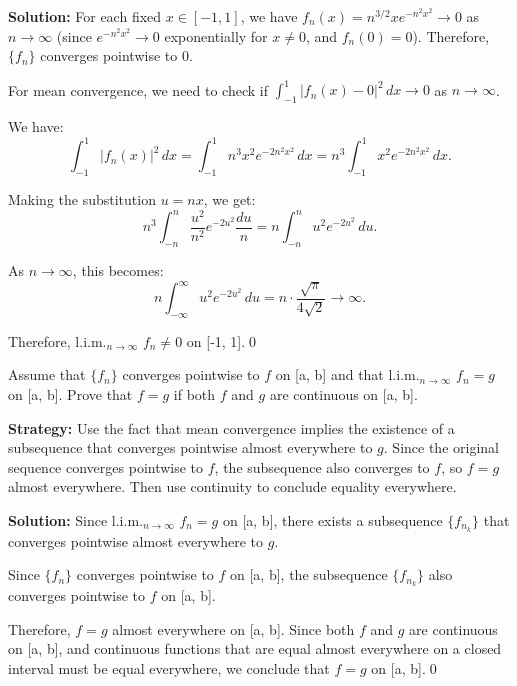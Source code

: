 \bigskip\noindent\textbf{Solution:} For each fixed \( x \in [-1, 1] \), we have \( f_n(x) = n^{3/2}xe^{-n^2x^2} \to 0 \) as \( n \to \infty \) (since \( e^{-n^2x^2} \to 0 \) exponentially for \( x \neq 0 \), and \( f_n(0) = 0 \)). Therefore, \( \{f_n\} \) converges pointwise to 0.

For mean convergence, we need to check if \( \int_{-1}^1 |f_n(x) - 0|^2 \, dx \to 0 \) as \( n \to \infty \).

We have:
\[\int_{-1}^1 |f_n(x)|^2 \, dx = \int_{-1}^1 n^3 x^2 e^{-2n^2x^2} \, dx = n^3 \int_{-1}^1 x^2 e^{-2n^2x^2} \, dx.\]

Making the substitution \( u = nx \), we get:
\[n^3 \int_{-n}^n \frac{u^2}{n^2} e^{-2u^2} \frac{du}{n} = n \int_{-n}^n u^2 e^{-2u^2} \, du.\]

As \( n \to \infty \), this becomes:
\[n \int_{-\infty}^{\infty} u^2 e^{-2u^2} \, du = n \cdot \frac{\sqrt{\pi}}{4\sqrt{2}} \to \infty.\]

Therefore, l.i.m.\(_{n\to\infty}\) \( f_n \neq 0 \) on [-1, 1].\qed


\begin{problembox}
Assume that \( \{f_n\} \) converges pointwise to \( f \) on [a, b] and that l.i.m.\(_{n\to\infty}\) \( f_n = g \) on [a, b]. Prove that \( f = g \) if both \( f \) and \( g \) are continuous on [a, b].
\end{problembox}

\noindent\textbf{Strategy:} Use the fact that mean convergence implies the existence of a subsequence that converges pointwise almost everywhere to \( g \). Since the original sequence converges pointwise to \( f \), the subsequence also converges to \( f \), so \( f = g \) almost everywhere. Then use continuity to conclude equality everywhere.

\bigskip\noindent\textbf{Solution:} Since l.i.m.\(_{n\to\infty}\) \( f_n = g \) on [a, b], there exists a subsequence \( \{f_{n_k}\} \) that converges pointwise almost everywhere to \( g \).

Since \( \{f_n\} \) converges pointwise to \( f \) on [a, b], the subsequence \( \{f_{n_k}\} \) also converges pointwise to \( f \) on [a, b].

Therefore, \( f = g \) almost everywhere on [a, b]. Since both \( f \) and \( g \) are continuous on [a, b], and continuous functions that are equal almost everywhere on a closed interval must be equal everywhere, we conclude that \( f = g \) on [a, b].\qed


